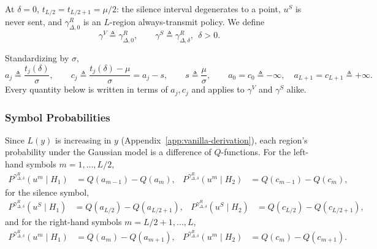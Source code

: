 \documentclass[11pt]{article}
\begin{document}
At $\delta=0$, $t_{L/2}=t_{L/2+1}=\mu/2$: the silence interval degenerates
to a point, $u^S$ is never sent, and $\gamma^R_{\Delta,0}$ is an
$L$-region always-transmit policy. We define
\begin{equation}
\gamma^V \triangleq \gamma^R_{\Delta,0}, \qquad
\gamma^S \triangleq \gamma^R_{\Delta,\delta}, \ \ \delta > 0.
\label{eq:vanilla-silent-def}
\end{equation}
 
 
Standardizing by $\sigma$,
\begin{equation}
a_j \triangleq \frac{t_j(\delta)}{\sigma}, \qquad
c_j \triangleq \frac{t_j(\delta)-\mu}{\sigma} = a_j - s, \qquad
s \triangleq \frac{\mu}{\sigma}, \qquad
a_0 = c_0 \triangleq -\infty, \quad a_{L+1}=c_{L+1}\triangleq+\infty.
\label{eq:general-standardized}
\end{equation}
Every quantity below is written in terms of $a_j,c_j$ and applies to
$\gamma^V$ and $\gamma^S$ alike.
 
\subsubsection*{Symbol Probabilities}

Since $L(y)$ is increasing in $y$ (Appendix~\ref{app:vanilla-derivation}),
each region's probability under the Gaussian model is a difference of
$Q$-functions. For the left-hand symbols $m = 1,\dots,L/2$,
\begin{align}
P^{\gamma^R_{\Delta,\delta}}(u^m\mid H_1) &= Q(a_{m-1}) - Q(a_m), &
P^{\gamma^R_{\Delta,\delta}}(u^m\mid H_2) &= Q(c_{m-1}) - Q(c_m),
\label{eq:prob-left}
\end{align}
for the silence symbol,
\begin{align}
P^{\gamma^R_{\Delta,\delta}}(u^S\mid H_1) &= Q(a_{L/2}) - Q(a_{L/2+1}), &
P^{\gamma^R_{\Delta,\delta}}(u^S\mid H_2) &= Q(c_{L/2}) - Q(c_{L/2+1}),
\label{eq:prob-silence}
\end{align}
and for the right-hand symbols $m = L/2+1,\dots,L$,
\begin{align}
P^{\gamma^R_{\Delta,\delta}}(u^m\mid H_1) &= Q(a_m) - Q(a_{m+1}), &
P^{\gamma^R_{\Delta,\delta}}(u^m\mid H_2) &= Q(c_m) - Q(c_{m+1}).
\label{eq:prob-right}
\end{align}
 
\end{document}
